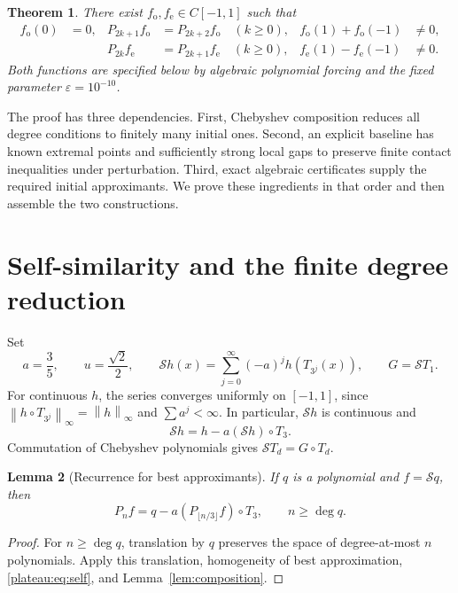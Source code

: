 \documentclass[11pt]{article}
\newtheorem{theorem}{Theorem}[section]
\newtheorem{lemma}[theorem]{Lemma}
\theoremstyle{remark}\newtheorem{remark}[theorem]{Remark}
\newcommand{\norm}[1]{\left\lVert #1\right\rVert_\infty}
\newcommand{\eps}{\varepsilon}
\begin{document}
\begin{theorem}\label{plateau:thm:main}
There exist $f_{\mathrm{o}},f_{\mathrm{e}}\in C[-1,1]$ such that
\begin{align*}
 f_{\mathrm{o}}(0)&=0,&
 P_{2k+1}f_{\mathrm{o}}&=P_{2k+2}f_{\mathrm{o}}\quad(k\ge0),&
 f_{\mathrm{o}}(1)+f_{\mathrm{o}}(-1)&\ne0,\\
 &&P_{2k}f_{\mathrm{e}}&=P_{2k+1}f_{\mathrm{e}}\quad(k\ge0),&
 f_{\mathrm{e}}(1)-f_{\mathrm{e}}(-1)&\ne0.
\end{align*}
Both functions are specified below by algebraic polynomial forcing and the
fixed parameter $\eps=10^{-10}$.
\end{theorem}

The proof has three dependencies. First, Chebyshev composition reduces all
degree conditions to finitely many initial ones. Second, an explicit
baseline has known extremal points and sufficiently strong local gaps to
preserve finite contact inequalities under perturbation. Third, exact
algebraic certificates supply the required initial approximants. We prove
these ingredients in that order and then assemble the two constructions.

\section{Self-similarity and the finite degree reduction}

Set
\[
 a=\frac35,\qquad u=\frac{\sqrt2}{2},\qquad
 \mathcal S h(x)=\sum_{j=0}^{\infty}(-a)^j h(T_{3^j}(x)),
 \qquad G=\mathcal S T_1.
\]
For continuous $h$, the series converges uniformly on $[-1,1]$, since
$\norm{h\circ T_{3^j}}=\norm h$ and $\sum a^j<\infty$. In particular,
$\mathcal S h$ is continuous and
\begin{equation}\label{plateau:eq:self}
 \mathcal S h=h-a(\mathcal S h)\circ T_3.
\end{equation}
Commutation of Chebyshev polynomials gives
$\mathcal S T_d=G\circ T_d$.



\begin{lemma}[Recurrence for best approximants]\label{plateau:lem:recurrence}
If $q$ is a polynomial and $f=\mathcal S q$, then
\begin{equation}\label{plateau:eq:bestrec}
 P_n f=q-a(P_{\lfloor n/3\rfloor}f)\circ T_3,
 \qquad n\ge\deg q.
\end{equation}
\end{lemma}
\begin{proof}
For $n\ge\deg q$, translation by $q$ preserves the space of degree-at-most
$n$ polynomials. Apply this translation, homogeneity of best approximation,
\eqref{plateau:eq:self}, and Lemma~\ref{lem:composition}.
\end{proof}
\end{document}
